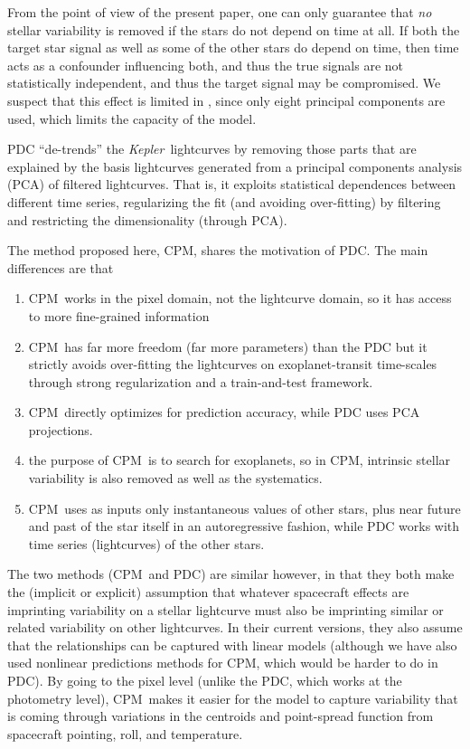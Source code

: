 \documentclass[12pt, preprint]{aastex}
\newcommand{\project}[1]{\textsl{#1}}
\newcommand{\Kepler}{\project{Kepler}}
\newcommand{\name}{CPM}
\begin{document}
From the point of view of the present paper, 
one can only guarantee that {\em no} stellar variability is removed if the stars do not depend on time at all. 
If both the target star signal as well as some of the other stars do depend on time, 
  then time acts as a confounder influencing both, and thus the true signals are not statistically independent, 
  and thus the target signal may be compromised. 
We suspect that this effect is limited in \cite{pdc2,pdc3}, 
  since only eight principal components are used, which limits the capacity of the model.

PDC ``de-trends'' the \Kepler\ lightcurves by removing those parts that are explained by the basis lightcurves
  generated from a principal components analysis (PCA) of filtered lightcurves.
That is, it exploits statistical dependences between different time series, regularizing the fit (and avoiding over-fitting) 
  by filtering and restricting the dimensionality (through PCA).




The method proposed here, \name, shares the motivation of PDC.
The main differences are that
\begin{enumerate}
\item
\name\ works in the pixel domain, not the lightcurve domain, so it has access to more fine-grained information
\item
\name\ has far more freedom (far more parameters) than the PDC
  but it strictly avoids over-fitting the lightcurves on exoplanet-transit time-scales
  through strong regularization and a train-and-test framework.
\item 
\name\ directly optimizes for prediction accuracy, while PDC uses PCA projections.
\item
the purpose of \name\ is to search for exoplanets, so in \name, intrinsic stellar
  variability is also removed as well as the systematics.
\item 
\name\ uses as inputs only instantaneous values of other stars, plus near future and past of the star itself in an autoregressive fashion, while PDC works with time series (lightcurves) of the other stars.
\end{enumerate}



The two methods (\name\ and PDC) are similar however,
  in that they both make the (implicit or explicit) assumption that whatever spacecraft effects are imprinting variability on a stellar lightcurve
  must also be imprinting similar or related variability on other lightcurves.
In their current versions, they also assume that the relationships can be captured with linear models (although we have also used nonlinear predictions methods for \name, which would be harder to do in PDC).
By going to the pixel level (unlike the PDC, which works at the photometry level),
  \name\ makes it easier for the model to capture variability
  that is coming through variations in the centroids and point-spread function
  from spacecraft pointing, roll, and temperature.
\end{document}
